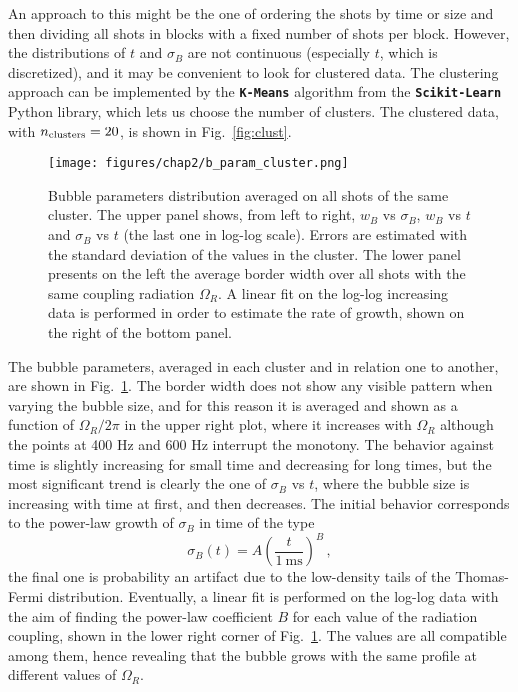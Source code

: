 An approach to this might be the one of ordering the shots by time or size and then dividing all shots in blocks with a fixed number of shots per block. However, the distributions of $t$ and $\sigma_B$ are not continuous (especially $t$, which is discretized), and it may be convenient to look for clustered data. 
The clustering approach can be implemented by the \texttt{\textbf{K-Means}} algorithm from the \texttt{\textbf{Scikit-Learn}} Python library, which lets us choose the number of clusters. The clustered data, with $n_{\rm clusters} = 20$, is shown in Fig.\ \ref{fig:clust}. 
\begin{figure}[ht!]
    \centering
    \texttt{[image: figures/chap2/b\_param\_cluster.png]}
    \caption{Bubble parameters distribution averaged on all shots of the same cluster. The upper panel shows, from left to right, $w_B$ vs $\sigma_B$, $w_B$ vs $t$ and $\sigma_B$ vs $t$ (the last one in log-log scale). Errors are estimated with the standard deviation of the values in the cluster. The lower panel presents on the left the average border width over all shots with the same coupling radiation $\Omega_R$. A linear fit on the log-log increasing data is performed in order to estimate the rate of growth, shown on the right of the bottom panel.}
    \label{fig:b_param}
\end{figure}

The bubble parameters, averaged in each cluster and in relation one to another, are shown in Fig.\ \ref{fig:b_param}. The border width does not show any visible pattern when varying the bubble size, and for this reason it is averaged and shown as a function of $\Omega_R/2\pi$ in the upper right plot, where it increases with $\Omega_R$ although the points at 400 Hz and 600 Hz interrupt the monotony. The behavior against time is slightly increasing for small time and decreasing for long times, but the most significant trend is clearly the one of $\sigma_B$ vs $t$, where the bubble size is increasing with time at first, and then decreases. The initial behavior corresponds to the power-law growth of $\sigma_B$ in time of the type
\[
    \sigma_B(t) = A\left(\frac{t}{1\ \unit{\milli\second}}\right)^B\, , 
\]
the final one is probability an artifact due to the low-density tails of the Thomas-Fermi distribution. Eventually, a linear fit is performed on the log-log data with the aim of finding the power-law coefficient $B$ for each value of the radiation coupling, shown in the lower right corner of Fig.\ \ref{fig:b_param}. The values are all compatible among them, hence revealing that the bubble grows with the same profile at different values of $\Omega_R$.

